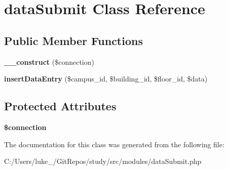 \hypertarget{classdata_submit}{}\section{data\+Submit Class Reference}
\label{classdata_submit}
\subsection*{Public Member Functions}
\begin{DoxyCompactItemize}
\item 
\mbox{\label{classdata_submit_a155afedbdfa01f1c0b813ca97642cdab}} 
{\bfseries \+\_\+\+\_\+construct} (\$connection)
\item 
\mbox{\label{classdata_submit_aab2bce97322f036ae21a134e0c73dbe1}} 
{\bfseries insert\+Data\+Entry} (\$campus\+\_\+id, \$building\+\_\+id, \$floor\+\_\+id, \$data)
\end{DoxyCompactItemize}
\subsection*{Protected Attributes}
\begin{DoxyCompactItemize}
\item 
\mbox{\label{classdata_submit_a0d9c79b9b86b3f5891c6d3892f12c6a0}} 
{\bfseries \$connection}
\end{DoxyCompactItemize}


The documentation for this class was generated from the following file\+:\begin{DoxyCompactItemize}
\item 
C\+:/\+Users/luke\+\_\+/\+Git\+Repos/study/src/modules/data\+Submit.\+php\end{DoxyCompactItemize}
